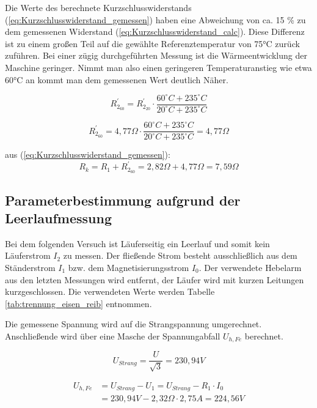 \documentclass[conference]{IEEEtran}
\begin{document}
Die Werte des berechnete Kurzschlusswiderstands
(\ref{eq:Kurzschlusswiderstand_gemessen}) haben eine Abweichung von ca. 15 \% zu
dem gemessenen Widerstand (\ref{eq:Kurzschlusswiderstand_calc}). Diese Differenz
ist zu einem großen Teil auf die gewählte Referenztemperatur von 75°C zurück
zuführen. Bei einer zügig durchgeführten Messung ist die Wärmeentwicklung der
Maschine geringer. Nimmt man also einen geringeren Temperaturanstieg wie etwa
60°C an kommt man dem gemessenen Wert deutlich Näher.

\begin{equation}
    R_{2_{60}}^\prime = R_{2_{20}}^\prime \cdot \dfrac{60^\circ \si{C} + 235^\circ \si{C}}{20^\circ \si{C} + 235^\circ \si{C}}
\end{equation}

\begin{equation}
    R_{2_{60}}^\prime = 4,77 \Omega \cdot \dfrac{60^\circ \si{C} + 235^\circ \si{C}}{20^\circ \si{C} + 235^\circ \si{C}} = 4,77 \Omega
\end{equation}

aus (\ref{eq:Kurzschlusswiderstand_gemessen}):
\begin{equation}
    \boxed{R_{k} = R_{1} + R_{2_{60}}^\prime = 2,82 \Omega + 4,77 \Omega = 7,59 \Omega}
\end{equation}


\subsection{Parameterbestimmung aufgrund der Leerlaufmessung}
Bei dem folgenden Versuch ist Läuferseitig ein Leerlauf und somit kein
Läuferstrom $I_{2}$ zu messen. Der fließende Strom besteht ausschließlich aus
dem Ständerstrom $I_{1}$ bzw. dem Magnetisierungsstrom $I_{0}$.
Der verwendete Hebelarm aus den letzten Messungen wird entfernt, der Läufer wird
mit kurzen Leitungen kurzgeschlossen.  Die verwendeten Werte werden Tabelle
\ref{tab:trennung_eisen_reib} entnommen.

Die gemessene Spannung wird auf die Strangspannung umgerechnet. Anschließende
wird über eine Masche der Spannungabfall $U_{h, Fe}$ berechnet.

\begin{equation}
    U_{Strang} = \dfrac{U}{ \sqrt{3} } = 230,94\si{V}
\end{equation}

\begin{align*}
    U_{h, Fe} & = U_{Strang} - U_{1} = U_{Strang} - R_{1} \cdot I_{0}        \\
              & = 230,94\si{V} - 2,32 \Omega \cdot 2,75\si{A} = 224,56\si{V}
\end{align*}
\end{document}
